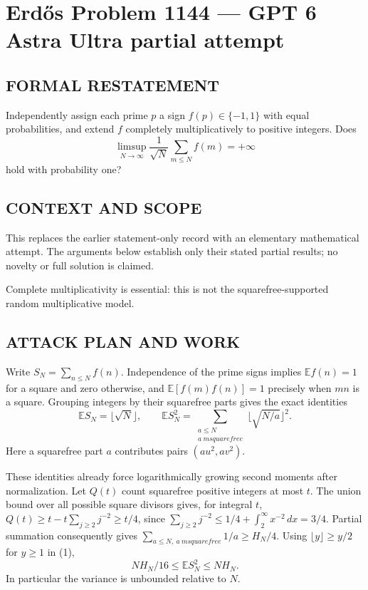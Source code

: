 \section*{Erd\H{o}s Problem 1144 --- GPT 6 Astra Ultra partial attempt}


\subsection*{FORMAL RESTATEMENT}
Independently assign each prime $p$ a sign $f(p)\in\{-1,1\}$ with equal probabilities, and extend $f$ completely multiplicatively to positive integers. Does
\[
\limsup_{N\to\infty}\frac{1}{\sqrt N}\sum_{m\leq N}f(m)=+\infty
\]
hold with probability one?

\subsection*{CONTEXT AND SCOPE}
This replaces the earlier statement-only record with an elementary mathematical attempt. The arguments below establish only their stated partial results; no novelty or full solution is claimed.

Complete multiplicativity is essential: this is not the squarefree-supported random multiplicative model.

\subsection*{ATTACK PLAN AND WORK}
Write $S_N=\sum_{n\le N}f(n)$. Independence of the prime signs implies
$\mathbb E f(n)=1$ for a square and zero otherwise, and
$\mathbb E[f(m)f(n)]=1$ precisely when $mn$ is a square. Grouping integers
by their squarefree parts gives the exact identities
\[
\mathbb E S_N=\lfloor\sqrt N\rfloor,\qquad
\mathbb E S_N^2=\sum_{\substack{a\le N\\a\ {
m squarefree}}}
                  \lfloor\sqrt{N/a}\rfloor^2.\tag{1}
\]
Here a squarefree part $a$ contributes pairs $(au^2,av^2)$.

These identities already force logarithmically growing second moments after
normalization. Let $Q(t)$ count squarefree positive integers at most $t$.
The union bound over all possible square divisors gives, for integral $t$,
$Q(t)\ge t-t\sum_{j\ge2}j^{-2}\ge t/4$, since
$\sum_{j\ge2}j^{-2}\le1/4+\int_2^\infty x^{-2}\,dx=3/4$.
Partial summation consequently gives
$\sum_{a\le N,\ a\ {
m squarefree}}1/a\ge H_N/4$.
Using $\lfloor y\rfloor\ge y/2$ for $y\ge1$ in (1),
\[NH_N/16\le\mathbb E S_N^2\le NH_N.\tag{2}\]
In particular the variance is unbounded relative to $N$.

